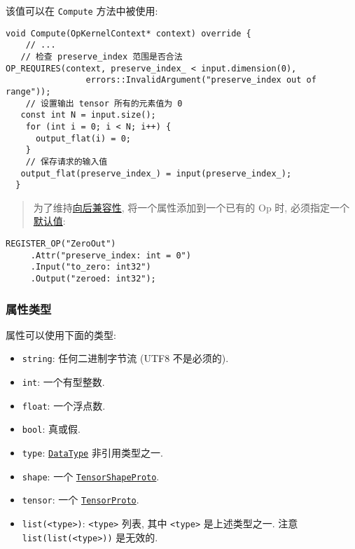 该值可以在 \texttt{Compute} 方法中被使用:

\begin{verbatim}
void Compute(OpKernelContext* context) override {
    // ...
   // 检查 preserve_index 范围是否合法
OP_REQUIRES(context, preserve_index_ < input.dimension(0),
                errors::InvalidArgument("preserve_index out of range"));
    // 设置输出 tensor 所有的元素值为 0
   const int N = input.size();
    for (int i = 0; i < N; i++) {
      output_flat(i) = 0;
    }
    // 保存请求的输入值
   output_flat(preserve_index_) = input(preserve_index_);
  }
\end{verbatim}

\begin{quote}
为了维持\protect\hyperlink{backwards-compatibility}{向后兼容性},
将一个属性添加到一个已有的 Op 时,
必须指定一个\protect\hyperlink{default-values-constraints}{默认值}:
\end{quote}

\begin{verbatim}
REGISTER_OP("ZeroOut")
     .Attr("preserve_index: int = 0")
     .Input("to_zero: int32")
     .Output("zeroed: int32");
\end{verbatim}

\subsubsection{属性类型 }\label{ux5c5eux6027ux7c7bux578b}

属性可以使用下面的类型:

\begin{itemize}
\tightlist
\item
  \texttt{string}: 任何二进制字节流 (UTF8 不是必须的).
\item
  \texttt{int}: 一个有型整数.
\item
  \texttt{float}: 一个浮点数.
\item
  \texttt{bool}: 真或假.
\item
  \texttt{type}:
  \href{https://tensorflow.googlesource.com/tensorflow/+/master/tensorflow/core/framework/types.cc\#DataTypeString}{\texttt{DataType}}
  非引用类型之一.
\item
  \texttt{shape}: 一个
  \href{https://tensorflow.googlesource.com/tensorflow/+/master/tensorflow/core/framework/tensor_shape.proto}{\texttt{TensorShapeProto}}.
\item
  \texttt{tensor}: 一个
  \href{https://tensorflow.googlesource.com/tensorflow/+/master/tensorflow/core/framework/tensor.proto}{\texttt{TensorProto}}.
\item
  \texttt{list(\textless{}type\textgreater{})}:
  \texttt{\textless{}type\textgreater{}} 列表, 其中
  \texttt{\textless{}type\textgreater{}} 是上述类型之一. 注意
  \texttt{list(list(\textless{}type\textgreater{}))} 是无效的.
\end{itemize}

